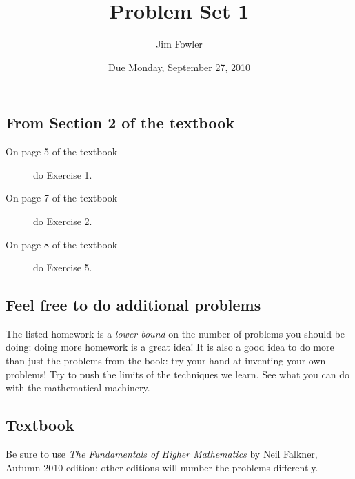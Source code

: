\documentclass[12pt]{handout}
\author{Jim Fowler}
\title{Problem Set 1}
\date{Due Monday, September 27, 2010}
\begin{document}
\maketitle










\subsection*{From Section 2 of the textbook}



\begin{description}

\item[On page 5 of the textbook] do Exercise 1.

\item[On page 7 of the textbook] do Exercise 2.

\item[On page 8 of the textbook] do Exercise 5.

\end{description}









\subsection*{Feel free to do additional problems}
The listed homework is a \textit{lower bound} on the number of
problems you should be doing: doing more homework is a great idea!  It
is also a good idea to do more than just the problems from the book:
try your hand at inventing your own problems!  Try to push the limits
of the techniques we learn.  See what you can do with the mathematical
machinery.



\subsection*{Textbook}
Be sure to use \textit{The Fundamentals of Higher Mathematics} by Neil Falkner, Autumn 2010 edition; other editions will number the problems differently.
\end{document}
